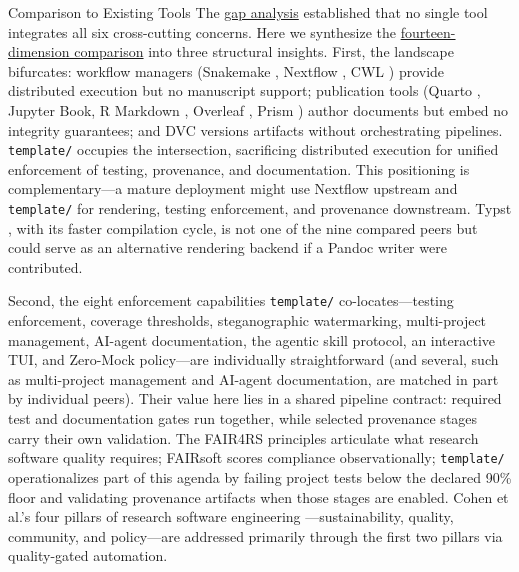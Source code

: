\documentclass[
  ignorenonframetext,
]{beamer}
\author{\texorpdfstring{}{}}
\date{}
\begin{document}
\begin{frame}{Comparison to Existing Tools}
\protect{}\label{comparison-to-existing-tools}
The \href{02_introduction.md\#the-gap}{gap analysis} established that no
single tool integrates all six cross-cutting concerns. Here we
synthesize the
\href{08f_appendix_matrix.md\#appendix-matrix}{fourteen-dimension
comparison} into three structural insights. First, the landscape
bifurcates: workflow managers (Snakemake ,
Nextflow , CWL )
provide distributed execution but no manuscript support; publication
tools (Quarto , Jupyter Book, R Markdown
, Overleaf \breakseq{[@overleaf2025]}, Prism
) author documents but embed no integrity
guarantees; and DVC  versions artifacts without
orchestrating pipelines. \texttt{template/} occupies the intersection,
sacrificing distributed execution for unified enforcement of testing,
provenance, and documentation. This positioning is complementary---a
mature deployment might use Nextflow upstream and \texttt{template/} for
rendering, testing enforcement, and provenance downstream. Typst
, with its faster compilation cycle, is not one of
the nine compared peers but could serve as an alternative rendering
backend if a Pandoc writer were contributed.

Second, the eight enforcement capabilities \texttt{template/}
co-locates---testing enforcement, coverage thresholds, steganographic
watermarking, multi-project management, AI-agent documentation, the
agentic skill protocol, an interactive TUI, and Zero-Mock policy---are
individually straightforward (and several, such as multi-project
management and AI-agent documentation, are matched in part by individual
peers). Their value here lies in a shared pipeline contract: required
test and documentation gates run together, while selected provenance
stages carry their own validation. The FAIR4RS principles
 articulate what research
software quality requires; FAIRsoft  scores
compliance observationally; \texttt{template/} operationalizes part of
this agenda by failing project tests below the declared 90\% floor and
validating provenance artifacts when those stages are enabled. Cohen et
al.'s four pillars of research software engineering
---sustainability, quality, community, and
policy---are addressed primarily through the first two pillars via
quality-gated automation.


\end{frame}
\end{document}
